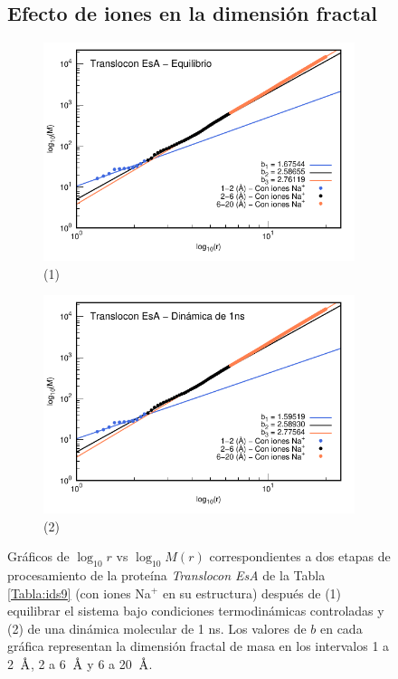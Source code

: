 	\begin{figure}[H]
		\subsection{Efecto de iones en la dimensi\'{o}n fractal}
		\label{subsec:EfectoIones}	
		\centering
		\begin{subfigure}{0.49\textwidth}
			\centering
			\includegraphics[width=\linewidth,page=1]{graphs/PDBs/7khw/ions/7khwEq-wions.pdf}
			\caption{(1)}
		\end{subfigure}
		\hfill
		\begin{subfigure}{0.49\textwidth}
			\centering
			\includegraphics[width=\linewidth,page=1]{graphs/PDBs/7khw/ions/7khw1ns-wions.pdf}
			\caption{(2)}
		\end{subfigure}
		\caption{Gr\'{a}ficos de $\log_{10}r$ vs $\log_{10}M(r)$ correspondientes a dos etapas de procesamiento de la prote\'{i}na \textit{Translocon EsA}  de la Tabla \ref{Tabla:ids9} (con iones Na$^{+}$ en su estructura) despu\'{e}s de (1) equilibrar el sistema bajo condiciones termodin\'{a}micas controladas y (2) de una din\'{a}mica molecular de 1 ns. Los valores de $b$ en cada gr\'{a}fica representan la dimensi\'{o}n fractal de masa en los intervalos 1 a 2~$\textup{\r{A}}$, 2 a 6~$\textup{\r{A}}$ y 6 a 20~$\textup{\r{A}}$.}
		\label{fig:7khw-wions}
	\end{figure}
	
